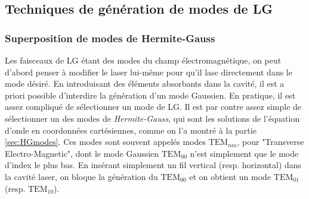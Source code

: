 \subsection{Techniques de génération de modes de LG}
\subsubsection{Superposition de modes de Hermite-Gauss}
\label{sec:hg_modes}
Les faisceaux de LG étant des modes du champ électromagnétique, on peut d'abord penser à modifier le laser lui-même pour qu'il lase directement dans le mode désiré. En introduisant des éléments absorbants dans la cavité, il est a priori possible d'interdire la génération d'un mode Gaussien. En pratique, il est assez compliqué de sélectionner un mode de LG. Il est par contre assez simple de sélectionner un des modes de \textit{Hermite-Gauss}, qui sont les solutions de l'équation d'onde en coordonnées cartésiennes, comme on l'a montré à la partie \ref{sec:HGmodes}. Ces modes sont souvent appelés modes $\mbox{TEM}_{nm}$, pour "Transverse Electro-Magnetic", dont le mode Gaussien $\mbox{TEM}_{00}$ n'est simplement que le mode d'index le plus bas. En insérant simplement un fil vertical (resp. horizontal) dans la cavité laser, on bloque la génération du $\mbox{TEM}_{00}$ et on obtient un mode $\mbox{TEM}_{01}$ (resp. $\mbox{TEM}_{10}$).

